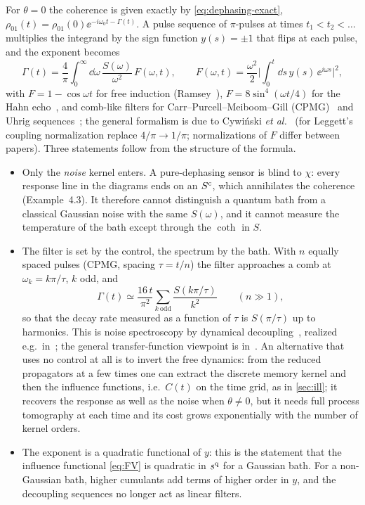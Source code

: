 For $\theta=0$ the coherence is given exactly by \cref{eq:dephasing-exact}, $\rho_{01}(t)=\rho_{01}(0)\ee^{-i\omega_0t-\Gamma(t)}$.
A pulse sequence of $\pi$-pulses at times $t_1<t_2<\dots$ multiplies the integrand by the sign function $y(s)=\pm1$ that flips at each pulse, and the exponent becomes
\begin{equation}
  \boxed{\;\Gamma(t)=\frac4\pi\int_0^\infty\!\dd\omega\,\frac{S(\omega)}{\omega^2}\,F(\omega,t),\qquad
  F(\omega,t)=\frac{\omega^2}{2}\Big|\int_0^t\!\dd s\,y(s)\,\ee^{i\omega s}\Big|^2 ,\;}
  \label{eq:filter}
\end{equation}
with $F=1-\cos\omega t$ for free induction (Ramsey~\cite{Ramsey1950}), $F=8\sin^4(\omega t/4)$ for the Hahn echo~\cite{Hahn1950}, and comb-like filters for Carr--Purcell--Meiboom--Gill (CPMG)~\cite{CarrPurcell1954,MeiboomGill1958} and Uhrig sequences~\cite{Uhrig2007}; the general formalism is due to Cywi\'nski \emph{et al.}~\cite{Cywinski2008} (for Leggett's coupling normalization replace $4/\pi\to1/\pi$; normalizations of $F$ differ between papers).
Three statements follow from the structure of the formula.
\begin{itemize}[itemsep=1pt]
\item Only the \emph{noise} kernel enters.
  A pure-dephasing sensor is blind to $\chi$: every response line in the diagrams ends on an $S^{\mathrm{c}}$, which annihilates the coherence (Example~4.3).
  It therefore cannot distinguish a quantum bath from a classical Gaussian noise with the same $S(\omega)$, and it cannot measure the temperature of the bath except through the $\coth$ in $S$.
\item The filter is set by the control, the spectrum by the bath.
  With $n$ equally spaced pulses (CPMG, spacing $\tau=t/n$) the filter approaches a comb at $\omega_k=k\pi/\tau$, $k$ odd, and
  \begin{equation}
    \Gamma(t)\simeq\frac{16\,t}{\pi^2}\sum_{k\ \mathrm{odd}}\frac{S(k\pi/\tau)}{k^2}\qquad(n\gg1),
    \label{eq:comb}
  \end{equation}
so that the decay rate measured as a function of $\tau$ is $S(\pi/\tau)$ up to harmonics.
This is noise spectroscopy by dynamical decoupling~\cite{AlvarezSuter2011,Yuge2011}, realized e.g.\ in~\cite{Bylander2011}; the general transfer-function viewpoint is in~\cite{Paz2017}.
An alternative that uses no control at all is to invert the free dynamics: from the reduced propagators at a few times one can extract the discrete memory kernel and then the influence functions, i.e.\ $C(t)$ on the time grid, as in \cref{sec:ill}; it recovers the response as well as the noise when $\theta\ne0$, but it needs full process tomography at each time and its cost grows exponentially with the number of kernel orders.
\item The exponent is a quadratic functional of $y$: this is the statement that the influence functional \eqref{eq:FV} is quadratic in $s^{\mathrm{q}}$ for a Gaussian bath.
  For a non-Gaussian bath, higher cumulants add terms of higher order in $y$, and the decoupling sequences no longer act as linear filters.
\end{itemize}

